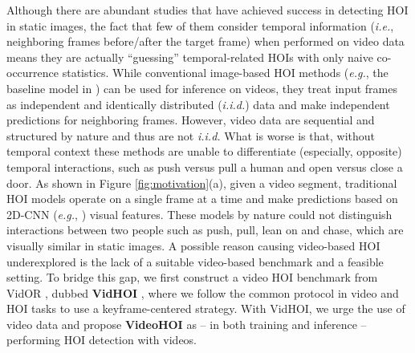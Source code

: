 \documentclass[sigconf]{acmart}
\begin{document}
Although there are abundant studies that have achieved success in detecting HOI in static images, the fact that few of them \cite{jain2016structural,qi2018learning,sunkesula2020lighten} consider temporal information (\emph{i.e.}, neighboring frames before/after the target frame) when performed on video data means they are actually ``guessing'' temporal-related HOIs with only naive co-occurrence statistics.
While conventional image-based HOI methods (\emph{e.g.}, the baseline model in \cite{wan2019pose}) can be used for inference on videos, they treat input frames as independent and identically distributed (\textit{i.i.d.}) data and make independent predictions for neighboring frames. 
However, video data are sequential and structured by nature and thus are not \textit{i.i.d.}
What is worse is that, without temporal context these methods are unable to differentiate (especially, opposite) temporal interactions, such as {\selectfont push} versus {\selectfont pull} a human and {\selectfont open} versus {\selectfont close} a door.
As shown in Figure \ref{fig:motivation}(a), given a video segment, traditional HOI models operate on a single frame at a time and make predictions based on 2D-CNN (\emph{e.g.}, \cite{he2016deep}) visual features.
These models by nature could not distinguish interactions between two people such as {\selectfont push}, {\selectfont pull}, {\selectfont lean on} and {\selectfont chase}, which are visually similar in static images. 
A possible reason causing video-based HOI underexplored is the lack of a suitable video-based benchmark and a feasible setting.
To bridge this gap, we first construct a video HOI benchmark from VidOR \cite{shang2019annotating}, dubbed \textbf{VidHOI}
, where we follow the common protocol in video and HOI tasks to use a keyframe-centered strategy.
With VidHOI, we urge the use of video data and propose \textbf{VideoHOI} as -- in both training and inference -- performing HOI detection with videos. 
\end{document}
